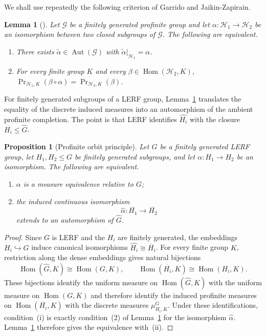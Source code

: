 \documentclass[11pt]{amsart}
\theoremstyle{plain}
\newtheorem{proposition}[theorem]{Proposition}
\newtheorem{lemma}[theorem]{Lemma}
\theoremstyle{definition}
\newcommand{\Hom}{\operatorname{Hom}}
\newcommand{\Aut}{\operatorname{Aut}}
\begin{document}
We shall use repeatedly the following criterion of Garrido and
Jaikin-Zapirain.
\begin{lemma}[{\cite[Proposition 3.2]{GJ}}]\label{lem:gj}
Let $\mathcal G$ be a finitely generated profinite group and let
$\alpha\colon \mathcal H_1\to\mathcal H_2$ be an isomorphism between two closed
subgroups of $\mathcal G$. The following are equivalent.
\begin{enumerate}
\item There exists $\widetilde\alpha\in\Aut(\mathcal G)$ with
      $\widetilde\alpha|_{\mathcal H_1}=\alpha$.
\item For every finite group $K$ and every $\beta\in\Hom(\mathcal H_2,K)$,
      $\Pr_{\mathcal H_1,K}(\beta\circ\alpha)=\Pr_{\mathcal H_2,K}(\beta)$.
\end{enumerate}
\end{lemma}
For finitely generated subgroups of a LERF group, Lemma~\ref{lem:gj} translates
the equality of the discrete induced measures into an automorphism of the
ambient profinite completion. The point is that LERF identifies
$\widehat{H_i}$ with the closure $\overline{H_i}\le\widehat G$.
\begin{proposition}[Profinite orbit principle]\label{prop:lerf}
Let $G$ be a finitely generated LERF group, let $H_1,H_2\le G$ be finitely
generated subgroups, and let $\alpha\colon H_1\to H_2$ be an isomorphism.  The
following are equivalent.
\begin{enumerate}
\item[(i)] $\alpha$ is a measure equivalence relative to $G$;
\item[(ii)] the induced continuous isomorphism
\[
  \widehat\alpha\colon\overline{H_1}\longrightarrow\overline{H_2}
\]
extends to an automorphism of $\widehat G$.
\end{enumerate}
\end{proposition}
\begin{proof}
Since $G$ is LERF and the $H_i$ are finitely generated, the embeddings
$H_i\hookrightarrow G$ induce canonical isomorphisms
$\widehat{H_i}\cong\overline{H_i}$.  For every finite group $K$, restriction
along the dense embeddings gives natural bijections
\[
  \Hom(\widehat G,K)\cong\Hom(G,K),\qquad
  \Hom(\overline{H_i},K)\cong\Hom(H_i,K).
\]
These bijections identify the uniform measure on $\Hom(\widehat G,K)$ with the
uniform measure on $\Hom(G,K)$ and therefore identify the induced profinite
measures on $\Hom(\overline{H_i},K)$ with the discrete measures
$\mu^G_{H_i,K}$.  Under these identifications, condition~(i) is exactly
condition~(2) of Lemma~\ref{lem:gj} for the isomorphism $\widehat\alpha$.
Lemma~\ref{lem:gj} therefore gives the equivalence with~(ii).
\end{proof}
\end{document}
